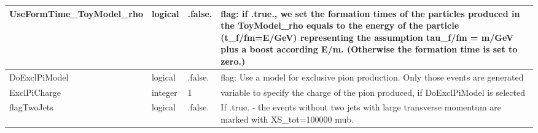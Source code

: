 \documentclass{article}
\begin{document}
\begin{longtable}{llll}
\midrule
UseFormTime\_ToyModel\_rho & \begin{minipage}[t]{2cm}logical\end{minipage} & \begin{minipage}[t]{2cm}.false.\end{minipage} & \begin{minipage}[t]{12cm}flag: if .true., we set the formation times of the particles produced in the ToyModel\_rho equals to the energy of the particle (t\_f/fm=E/GeV) representing the assumption tau\_f/fm = m/GeV plus a boost according E/m. (Otherwise the formation time is set to zero.)\end{minipage}\\*
\midrule
DoExclPiModel & \begin{minipage}[t]{2cm}logical\end{minipage} & \begin{minipage}[t]{2cm}.false.\end{minipage} & \begin{minipage}[t]{12cm}flag: Use a model for exclusive pion production. Only those events are generated\end{minipage}\\*
\midrule
ExclPiCharge & \begin{minipage}[t]{2cm}integer\end{minipage} & \begin{minipage}[t]{2cm}1\end{minipage} & \begin{minipage}[t]{12cm}variable to specify the charge of the pion produced, if DoExclPiModel is selected\end{minipage}\\*
\midrule
flagTwoJets & \begin{minipage}[t]{2cm}logical\end{minipage} & \begin{minipage}[t]{2cm}.false.\end{minipage} & \begin{minipage}[t]{12cm}If .true. - the events without two jets with large transverse momentum are marked with XS\_tot=100000 mub.\end{minipage}\\*
\bottomrule
\end{longtable}
{ }



\end{document}
